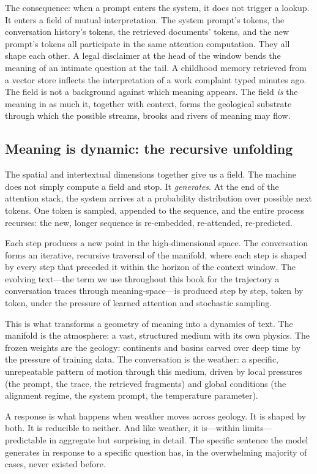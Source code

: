 The consequence: when a prompt enters the system, it does not trigger a lookup. It enters a field of mutual interpretation. The system prompt's tokens, the conversation history's tokens, the retrieved documents' tokens, and the new prompt's tokens all participate in the same attention computation. They all shape each other. A legal disclaimer at the head of the window bends the meaning of an intimate question at the tail. A childhood memory retrieved from a vector store inflects the interpretation of a work complaint typed minutes ago. The field is not a background against which meaning appears. The field \emph{is} the meaning in as much it, together with context, forms the geological substrate through which the possible streams, brooks and rivers of meaning may flow.

\subsection{Meaning is dynamic: the recursive unfolding}

The spatial and intertextual dimensions together give us a field. The machine does not simply compute a field and stop. It \emph{generates}. At the end of the attention stack, the system arrives at a probability distribution over possible next tokens. One token is sampled, appended to the sequence, and the entire process recurses: the new, longer sequence is re-embedded, re-attended, re-predicted.

Each step produces a new point in the high-dimensional space. The conversation forms an iterative, recursive traversal of the manifold, where each step is shaped by every step that preceded it within the horizon of the context window. The evolving text---the term we use throughout this book for the trajectory a conversation traces through meaning-space---is produced step by step, token by token, under the pressure of learned attention and stochastic sampling.

This is what transforms a geometry of meaning into a dynamics of text. The manifold is the atmosphere: a vast, structured medium with its own physics. The frozen weights are the geology: continents and basins carved over deep time by the pressure of training data. The conversation is the weather: a specific, unrepeatable pattern of motion through this medium, driven by local pressures (the prompt, the trace, the retrieved fragments) and global conditions (the alignment regime, the system prompt, the temperature parameter).

A response is what happens when weather moves across geology. It is shaped by both. It is reducible to neither. And like weather, it is---within limits---predictable in aggregate but surprising in detail. The specific sentence the model generates in response to a specific question has, in the overwhelming majority of cases, never existed before.

